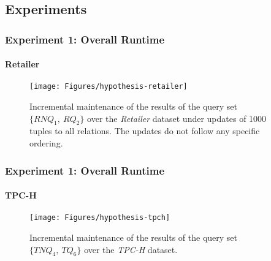 \documentclass[
	11pt, %
]{beamer}
\begin{document}
\subsection{Experiments}
\begin{frame}
	\frametitle{Experiment 1: Overall Runtime}
	\framesubtitle{Retailer}
	\begin{figure}
		\begin{minipage}{0.25\textwidth}
		\end{minipage}
		\begin{minipage}{0.74\textwidth}
			\texttt{[image: Figures/hypothesis-retailer]} %
		\end{minipage}
		\caption{Incremental maintenance of the results of the query set $\{RNQ_1,\ RQ_2\}$ over the {\em Retailer} dataset under updates of 1000 tuples to all relations. The updates do not follow any specific ordering. }
	\end{figure}
\end{frame}

\begin{frame}
	\frametitle{Experiment 1: Overall Runtime}
	\framesubtitle{TPC-H}
	\begin{figure}		
		\begin{minipage}{0.25\textwidth}
		\end{minipage}
		\begin{minipage}{0.74\textwidth}
			\texttt{[image: Figures/hypothesis-tpch]} %
		\end{minipage}
		\caption{Incremental maintenance of the results of the query set $\{TNQ_4,\ TQ_6\}$ over the {\em TPC-H} dataset.}
	\end{figure}
\end{frame}
\end{document}
